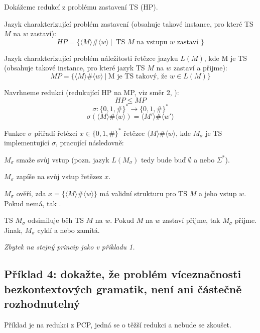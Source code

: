 \begin{compactitem}
    \item Dokážeme redukcí z problému zastavení TS (HP).

    \item Jazyk charakterizující problém zastavení (obsahuje takové instance, pro které TS $M$ na $w$ zastaví):
    $$ HP = \{ \langle M \rangle \# \langle w \rangle ~|~ \text{ TS } M \text{ na vstupu } w \text{ zastaví } \} $$

    \item Jazyk charakterizující problém náležitosti řetězce jazyku $L(M)$, kde M je TS (obsahuje takové instance, pro které jazyk TS $M$ na $w$ zastaví a přijme):
    $$ MP = \{ \langle M \rangle \# \langle w \rangle ~|~ \text{M je TS takový, že } w \in L(M) \} $$

    \item Navrhneme redukci (redukující HP na MP, viz směr 2, ):
    $$ HP \leq MP $$
    $$ \sigma : \{ 0, 1, \# \}^* \rightarrow \{ 0, 1, \# \}^* $$
    $$ \sigma(\langle M \rangle \# \langle w \rangle) = \langle M' \rangle \# \langle w' \rangle $$

    \item Funkce $\sigma$ přiřadí řetězci $x \in \{ 0, 1, \# \}^*$ řetězec $\langle M \rangle \# \langle w \rangle$, kde $M_{\sigma}$ je TS implementující $\sigma$, pracující následovně: \begin{compactitem}

        \item $M_{\sigma}$ smaže svůj vstup (pozn. jazyk $L(M_{\sigma})$ tedy bude buď $\emptyset$ a nebo $\Sigma^*$).

        \item $M_{\sigma}$ zapíše na svůj vstup řetězez $x$.

        \item $M_{\sigma}$ ověří, zda $x = \{ \langle M \rangle \# \langle w \rangle \}$ má validní strukturu pro TS $M$ a jeho vstup $w$. Pokud nemá, tak .

        \item TS $M_{\sigma}$ odsimiluje běh TS $M$ na $w$. Pokud $M$ na $w$ zastaví přijme, tak $M_{\sigma}$ přijme. Jinak, $M_{\sigma}$ cyklí a nebo zamítá.
    \end{compactitem}

    \item \textit{Zbytek na stejný princip jako v příkladu 1.}
\end{compactitem}

\subsection*{Příklad 4: dokažte, že problém víceznačnosti bezkontextových gramatik, není ani částečně rozhodnutelný}

Příklad je na redukci z PCP, jedná se o těžší redukci a nebude se zkoušet.

